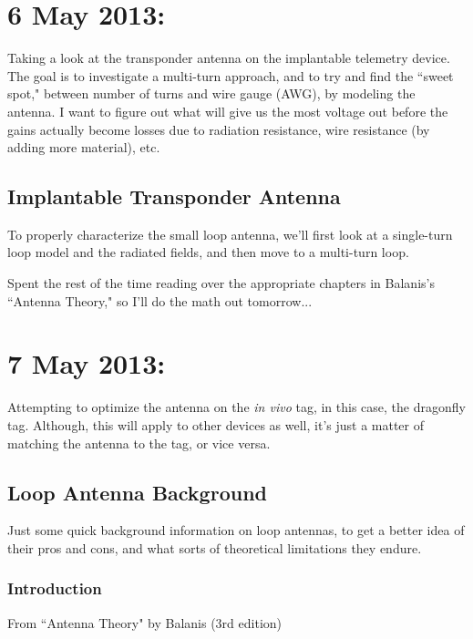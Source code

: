 \documentclass[12pt,onecolumn,titlepage]{article}
\begin{document}
\clearpage
\section{6 May 2013:}

\indent \indent Taking a look at the transponder antenna on the implantable telemetry device. The goal is to investigate a multi-turn approach, and to try and find the ``sweet spot," between number of turns and wire gauge (AWG), by modeling the antenna. I want to figure out what will give us the most voltage out before the gains actually become losses due to radiation resistance, wire resistance (by adding more material), etc.

\subsection{Implantable Transponder Antenna}
\indent \indent To properly characterize the small loop antenna, we'll first look at a single-turn loop model and the radiated fields, and then move to a multi-turn loop.



Spent the rest of the time reading over the appropriate chapters in Balanis's ``Antenna Theory," so I'll do the math out tomorrow...




\clearpage
\section{7 May 2013:}

\indent \indent Attempting to optimize the antenna on the {\emph{in vivo}} tag, in this case, the dragonfly tag. Although, this will apply to other devices as well, it's just a matter of matching the antenna to the tag, or vice versa.

\subsection{Loop Antenna Background}
\indent \indent Just some quick background information on loop antennas, to get a better idea of their pros and cons, and what sorts of theoretical limitations they endure.

\subsubsection{Introduction}
From ``Antenna Theory" by Balanis (3rd edition)
\end{document}

